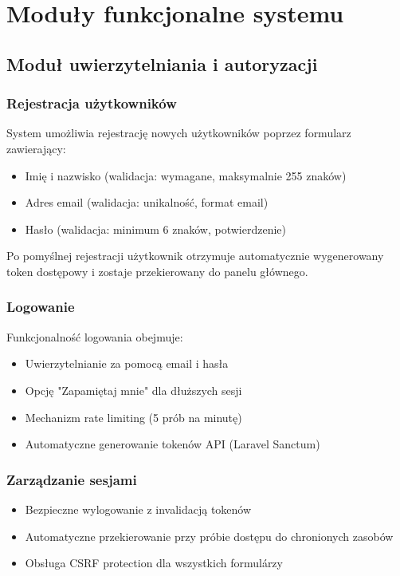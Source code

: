 \documentclass[12pt,a4paper]{article}
\begin{document}
    \section{Moduły funkcjonalne systemu}

    \subsection{Moduł uwierzytelniania i autoryzacji}

    \subsubsection{Rejestracja użytkowników}
    System umożliwia rejestrację nowych użytkowników poprzez formularz zawierający:
    \begin{itemize}
        \item Imię i nazwisko (walidacja: wymagane, maksymalnie 255 znaków)
        \item Adres email (walidacja: unikalność, format email)
        \item Hasło (walidacja: minimum 6 znaków, potwierdzenie)
    \end{itemize}

    Po pomyślnej rejestracji użytkownik otrzymuje automatycznie wygenerowany token dostępowy i zostaje przekierowany do panelu głównego.

    \subsubsection{Logowanie}
    Funkcjonalność logowania obejmuje:
    \begin{itemize}
        \item Uwierzytelnianie za pomocą email i hasła
        \item Opcję "Zapamiętaj mnie" dla dłuższych sesji
        \item Mechanizm rate limiting (5 prób na minutę)
        \item Automatyczne generowanie tokenów API (Laravel Sanctum)
    \end{itemize}

    \subsubsection{Zarządzanie sesjami}
    \begin{itemize}
        \item Bezpieczne wylogowanie z invalidacją tokenów
        \item Automatyczne przekierowanie przy próbie dostępu do chronionych zasobów
        \item Obsługa CSRF protection dla wszystkich formulárzy
    \end{itemize}
\end{document}
